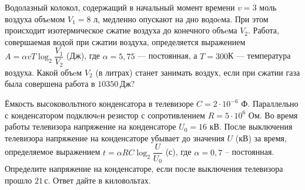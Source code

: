 %
%
\begin{class}[number=4]
	\begin{listofex}
		\item {}
		\item Водолазный колокол, содержащий в начальный момент времени  \( v = 3 \) моль воздуха объeмом \( V_1=8 \) л, медленно опускают на дно водоeма. При этом происходит изотермическое сжатие воздуха до конечного объeма \( V_2 \). Работа, совершаемая водой при сжатии воздуха, определяется выражением \( A=\alpha vT\log_2\dfrac{V_1}{V_2} \) (Дж), где \(  \alpha=5,75 \) --- постоянная, а \( T = 300 \)К --- температура воздуха. Какой объeм \( V_2 \) (в литрах) станет занимать воздух, если при сжатии газа была совершена работа в \( 10 350 \) Дж?	
		\item Ёмкость высоковольтного конденсатора в телевизоре \( C=2\cdot10^{-6} \) Ф. Параллельно с конденсатором подключeн резистор с сопротивлением \( R=5\cdot10^6 \) Ом. Во время работы телевизора напряжение на конденсаторе \(  U_0 = 16 \) кВ. После выключения телевизора напряжение на конденсаторе убывает до значения \( U \) (кВ) за время, определяемое выражением \( t=\alpha RC\log_2\dfrac{U}{U_0} \) (с), где \( \alpha=0,7 \) -- постоянная. Определите напряжение на конденсаторе, если после выключения телевизора прошло \( 21 \) с. Ответ дайте в киловольтах.
		\item {}
		\item {}
		\item {}
		\item {}
		\item {}
		\item {}
		\item {}
		\item {}
		\item {}
		\item {}
		\item {}
	\end{listofex}
\end{class}
%
%
%
